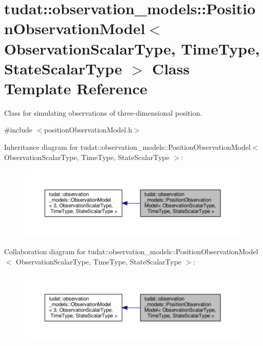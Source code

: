 \hypertarget{classtudat_1_1observation__models_1_1PositionObservationModel}{}\section{tudat\+:\+:observation\+\_\+models\+:\+:Position\+Observation\+Model$<$ Observation\+Scalar\+Type, Time\+Type, State\+Scalar\+Type $>$ Class Template Reference}
\label{classtudat_1_1observation__models_1_1PositionObservationModel}


Class for simulating observations of three-\/dimensional position.  




{\ttfamily \#include $<$position\+Observation\+Model.\+h$>$}



Inheritance diagram for tudat\+:\+:observation\+\_\+models\+:\+:Position\+Observation\+Model$<$ Observation\+Scalar\+Type, Time\+Type, State\+Scalar\+Type $>$\+:
\nopagebreak
\begin{figure}[H]
\begin{center}
\leavevmode
\includegraphics[width=350pt]{classtudat_1_1observation__models_1_1PositionObservationModel__inherit__graph}
\end{center}
\end{figure}


Collaboration diagram for tudat\+:\+:observation\+\_\+models\+:\+:Position\+Observation\+Model$<$ Observation\+Scalar\+Type, Time\+Type, State\+Scalar\+Type $>$\+:
\nopagebreak
\begin{figure}[H]
\begin{center}
\leavevmode
\includegraphics[width=350pt]{classtudat_1_1observation__models_1_1PositionObservationModel__coll__graph}
\end{center}
\end{figure}
